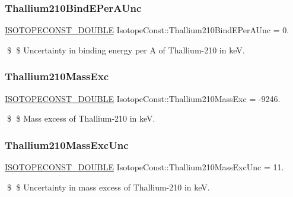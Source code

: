 \subsubsection{\texorpdfstring{Thallium210\+Bind\+E\+Per\+A\+Unc}{Thallium210BindEPerAUnc}}
{\footnotesize\ttfamily \mbox{\hyperlink{group___isotope_const-_macros_ga8f45a7272ce02c0b4c65c44636ed719a}{I\+S\+O\+T\+O\+P\+E\+C\+O\+N\+S\+T\+\_\+\+D\+O\+U\+B\+LE}} Isotope\+Const\+::\+Thallium210\+Bind\+E\+Per\+A\+Unc = 0.}

\$ \$ Uncertainty in binding energy per A of Thallium-\/210 in keV. \mbox{\label{group___isotope_const-_thallium-_tl210_gadbb91c5a22f5189b2138429a863b55f1}} 
\subsubsection{\texorpdfstring{Thallium210\+Mass\+Exc}{Thallium210MassExc}}
{\footnotesize\ttfamily \mbox{\hyperlink{group___isotope_const-_macros_ga8f45a7272ce02c0b4c65c44636ed719a}{I\+S\+O\+T\+O\+P\+E\+C\+O\+N\+S\+T\+\_\+\+D\+O\+U\+B\+LE}} Isotope\+Const\+::\+Thallium210\+Mass\+Exc = -\/9246.}

\$ \$ Mass excess of Thallium-\/210 in keV. \mbox{\label{group___isotope_const-_thallium-_tl210_ga0c54e71bf583fbac592037abc4c0d3fa}} 
\subsubsection{\texorpdfstring{Thallium210\+Mass\+Exc\+Unc}{Thallium210MassExcUnc}}
{\footnotesize\ttfamily \mbox{\hyperlink{group___isotope_const-_macros_ga8f45a7272ce02c0b4c65c44636ed719a}{I\+S\+O\+T\+O\+P\+E\+C\+O\+N\+S\+T\+\_\+\+D\+O\+U\+B\+LE}} Isotope\+Const\+::\+Thallium210\+Mass\+Exc\+Unc = 11.}

\$ \$ Uncertainty in mass excess of Thallium-\/210 in keV. \mbox{\label{group___isotope_const-_thallium-_tl210_ga29b4529a50e5f78658888263b3ea63d9}} 

